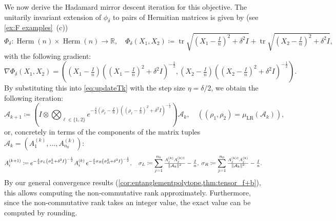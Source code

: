 \documentclass[11pt,letterpaper]{article}
\numberwithin{equation}{section}
\newcommand{\RR}{\mathbb{R}}
\DeclareMathOperator{\tr}{tr}
\DeclareMathOperator{\Herm}{Herm}
\DeclarePairedDelimiter\norm{\lVert}{\rVert}
\begin{document}
We now derive the Hadamard mirror descent iteration for this objective.
The unitarily invariant extension of $\phi_\delta$ to pairs of Hermitian matrices is given by (see \cref{ex:F examples}~(c))
\[
    \Phi_\delta \colon \Herm(n) \times \Herm(n) \to \RR, \quad
    \Phi_\delta(X_1, X_2) \coloneqq \tr\sqrt{\left(X_1 - \tfrac{I}n\right)^2 + \delta^2I} + \tr\sqrt{\left(X_2 - \tfrac{I}n\right)^2 + \delta^2I},
\]
with the following gradient:
\[
    \nabla\Phi_\delta(X_1, X_2) = \left(\left(X_1 - \tfrac{I}n\right)\left(\left(X_1 - \tfrac{I}n\right)^2 + \delta^2I\right)^{-\frac12}, \left(X_2 - \tfrac{I}n\right)\left(\left(X_2 - \tfrac{I}n\right)^2 + \delta^2I\right)^{-\frac12}\right).
\]
By substituting this into \cref{eq:updateTk} with the step size $\eta = \delta/2$, we obtain the following iteration:
\begin{equation*}
    \mathcal{A}_{k+1} \coloneqq \left(I \otimes\bigotimes_{\ell \in \{1, 2\}} e^{-\frac{\delta}4\left(\rho_\ell -\frac{I}n\right)\left(\left(\rho_\ell - \frac{I}n\right)^2 + \delta^2I\right)^{-\frac12}}\right)\mathcal A_k,
    \quad ((\rho_1,\rho_2) = \mu_{\mathrm{LR}}(\mathcal{A}_k)),
\end{equation*}
or, concretely in terms of the components of the matrix tuples~$\mathcal A_k = (A^{(k)}_1,\dots,A^{(k)}_{n_0})$:
\begin{equation}\label{eq:ncrank update concrete}
    A^{(k+1)}_i \coloneqq e^{-\frac{\delta}4 \sigma_L \left(\sigma_L^2 + \delta^2I\right)^{-\frac12}} A^{(k)}_i \, e^{-\frac{\delta}4\sigma_R\left(\sigma_R^2 + \delta^2I\right)^{-\frac12}},
    \quad
    \sigma_L \coloneqq \sum_{j=1}^{n_0} \tfrac {A_j^{(k)} A_j^{(k)\dagger}} {\norm{\mathcal A_k}^2} - \tfrac I n, \;
    \sigma_R \coloneqq \sum_{j=1}^{n_0} \tfrac {A_j^{(k)\dagger} A_j^{(k)}} {\norm{\mathcal A_k}^2} - \tfrac I n.
\end{equation}
By our general convergence results (\cref{cor:entanglementpolytope,thm:tensor_f+b}), this allows computing the non-commutative rank approximately.
Furthermore, since the non-commutative rank takes an integer value, the exact value can be computed by rounding.
\end{document}
